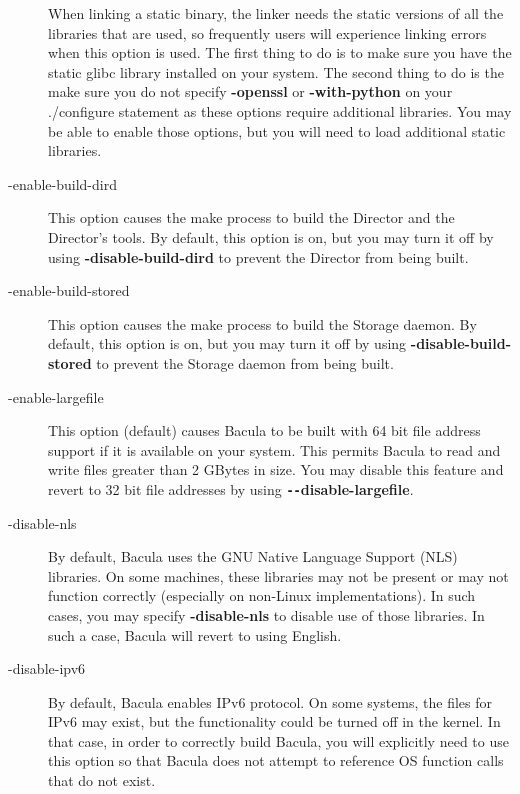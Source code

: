 \begin{description}
   When linking a static binary, the linker needs the static versions
   of all the libraries that are used, so frequently users will 
   experience linking errors when this option is used. The first 
   thing to do is to make sure you have the static glibc library 
   installed on your system. The second thing to do is the make sure
   you do not specify {\bf {-}{\-}openssl} or {\bf {-}{\-}with-python}
   on your ./configure statement as these options require additional
   libraries. You may be able to enable those options, but you will
   need to load additional static libraries.

\item [ {-}{\-}enable-build-dird]
   This option causes the make process to build the Director and the
   Director's tools. By default, this option is on, but you may turn
   it off by using {\bf {-}{\-}disable-build-dird} to prevent the
   Director from being built.

\item [ {-}{\-}enable-build-stored]
   This option causes the make process to build the Storage daemon.
   By default, this option is on, but you may turn
   it off by using {\bf {-}{\-}disable-build-stored} to prevent the
   Storage daemon from being built.


\item [ {-}{\-}enable-largefile]
   This option (default) causes  Bacula to be built with 64 bit file address
   support if it  is available on your system. This permits Bacula to read and 
   write files greater than 2 GBytes in size. You may disable this  feature and
   revert to 32 bit file addresses by using  {\bf \verb:--:disable-largefile}.  

\item [ {-}{\-}disable-nls]
   By default, Bacula uses the GNU Native Language Support (NLS) libraries. On
   some machines, these libraries may not be present or may not function 
   correctly (especially on non-Linux implementations). In such cases, you
   may specify {\bf {-}{\-}disable-nls} to disable use of those libraries.
   In such a case, Bacula will revert to using English.

\item [ {-}{\-}disable-ipv6 ]
   By default, Bacula enables IPv6 protocol. On some systems, the files
   for IPv6 may exist, but the functionality could be turned off in the
   kernel. In that case, in order to correctly build Bacula, you will
   explicitly need to use this option so that Bacula does not attempt
   to reference OS function calls that do not exist.


\end{description}
